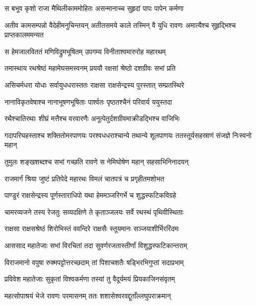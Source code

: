 
\twolineshloka
{स बभूव कृशो राजा मैथिलीकाममोहितः}
{असन्मानाच्च सुहृदां पापः पापेन कर्मणा} %

\threelineshloka
{अतीव कामसम्पन्नो वैदेहीमनुचिन्तयन्}
{अतीतसमये काले तस्मिन् वै युधि रावणः}
{अमात्यैश्च सुहृद्भिश्च प्राप्तकालममन्यत} %

\twolineshloka
{स हेमजालविततं मणिविद्रुमभूषितम्}
{उपगम्य विनीताश्वमारुरोह महारथम्} %

\twolineshloka
{तमास्थाय रथश्रेष्ठं महामेघसमस्वनम्}
{प्रययौ रक्षसां श्रेष्ठो दशग्रीवः सभां प्रति} %

\twolineshloka
{असिचर्मधरा योधाः सर्वायुधधरास्ततः}
{राक्षसा राक्षसेन्द्रस्य पुरस्तात् सम्प्रतस्थिरे} %

\twolineshloka
{नानाविकृतवेषाश्च नानाभूषणभूषिताः}
{पार्श्वतः पृष्ठतश्चैनं परिवार्य ययुस्तदा} %

\twolineshloka
{रथैश्चातिरथाः शीघ्रं मत्तैश्च वरवारणैः}
{अनूत्पेतुर्दशग्रीवमाक्रीडद्भिश्च वाजिभिः} %

\threelineshloka
{गदापरिघहस्ताश्च शक्तितोमरपाणयः}
{परश्वधधराश्चान्ये तथान्ये शूलपाणयः}
{ततस्तूर्यसहस्राणं संजज्ञे निःस्वनो महान्} %

\twolineshloka
{तुमुलः शङ्खशब्दश्च सभां गच्छति रावणे}
{स नेमिघोषेण महान् सहसाभिनिनादयन्} %

\twolineshloka
{राजमार्गं श्रिया जुष्टं प्रतिपेदे महारथः}
{विमलं चातपत्रं च प्रगृहीतमशोभत} %

\twolineshloka
{पाण्डुरं राक्षसेन्द्रस्य पूर्णस्ताराधिपो यथा}
{हेममञ्जरिगर्भे च शुद्धस्फटिकविग्रहे} %

\twolineshloka
{चामरव्यजने तस्य रेजतुः सव्यदक्षिणे}
{ते कृताञ्जलयः सर्वे रथस्थं पृथिवीस्थिताः} %

\twolineshloka
{राक्षसा राक्षसश्रेष्ठं शिरोभिस्तं ववन्दिरे}
{राक्षसैः स्तूयमानः सञ्जयाशीर्भिररिंदमः} %

\twolineshloka
{आससाद महातेजाः सभां विरचितां तदा}
{सुवर्णरजतास्तीर्णां विशुद्धस्फटिकान्तराम्} %

\twolineshloka
{विराजमानो वपुषा रुक्मपट्टोत्तरच्छदाम्}
{तां पिशाचशतैः षड्भिरभिगुप्तां सदाप्रभाम्} %

\twolineshloka
{प्रविवेश महातेजाः सुकृतां विश्वकर्मणा}
{तस्यां तु वैदूर्यमयं प्रियकाजिनसंवृतम्} %

\twolineshloka
{महत्सोपाश्रयं भेजे रावणः परमासनम्}
{ततः शशासेश्वरवद्दूताँल्लघुपराक्रमान्} %

